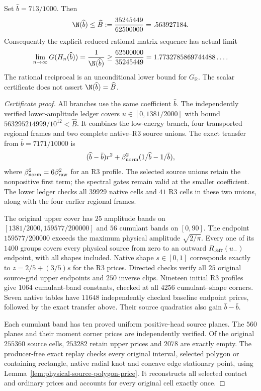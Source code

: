 \begin{proposition}
\label{prop:base-final29-713}
Set $\widehat b=713/1000$. Then
\[
 \N(\widehat b)\le\widehat B:=\frac{35245449}{62500000}
 =.563927184.
\]
Consequently the explicit reduced rational matrix sequence has actual limit
\[
 \lim_{n\to\infty}G(H_n(\widehat b))
 =\frac1{\N(\widehat b)}
 \ge\frac{62500000}{35245449}
 =1.7732785869744488\ldots .
\]
The rational reciprocal is an unconditional lower bound for
$G_{\mathbb R}$. The scalar certificate does not assert
$\N(\widehat b)=\widehat B$.
\end{proposition}
\begin{proof}[Certificate proof]
All branches use the same coefficient $\widehat b$. The independently
verified lower-amplitude ledger covers $u\in[0,1381/2000]$ with bound
$563295214999/10^{12}<\widehat B$. It combines the low-energy branch,
four transported regional frames and two complete native--R3 source
unions. The exact transfer from $\bar b=7171/10000$ is
\[
 (\widehat b-\bar b)r^2+
 \beta_{\rm norm}^2(1/\widehat b-1/\bar b),
\]
where $\beta_{\rm norm}^2=6\beta_{\rm raw}^2$ for an R3 profile.
The selected source unions retain the nonpositive first term; the
spectral gates remain valid at the smaller coefficient. The lower
ledger checks all $39929$ native cells and $41$ R3 cells in these two
unions, along with the four earlier regional frames.

The original upper cover has $25$ amplitude bands on
$[1381/2000,159577/200000]$ and $56$ cumulant bands on $[0,90]$.
The endpoint $159577/200000$ exceeds the maximum physical amplitude
$\sqrt{2/\pi}$. Every one of its $1400$ groups covers every physical
source from zero to an outward $R_{.847}(u_-)$ endpoint, with all shapes
included. Native shape $s\in[0,1]$ corresponds exactly to
$z=2/5+(3/5)s$ for the R3 prices. Directed checks verify all $25$
original source-grid upper endpoints and $250$ inverse clips.
Nineteen initial R3 profiles give $1064$ cumulant-band constants,
checked at all $4256$ cumulant--shape corners. Seven native tables
have $11648$ independently checked baseline endpoint prices, followed
by the exact transfer above. Their source quadratics also gain
$\widehat b-\bar b$.

Each cumulant band has ten proved uniform positive-head source planes.
The $560$ planes and their moment corner prices are independently
verified. Of the original $255360$ source cells, $253282$ retain
upper prices and $2078$ are exactly empty. The producer-free exact
replay checks every original interval, selected polygon or containing
rectangle, native radial knot and concave edge stationary point, using
Lemma~\ref{lem:physical-source-polygon-price}. It reconstructs all
selected contact and ordinary prices and accounts for every original
cell exactly once.


\end{proof}
